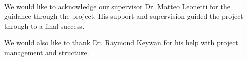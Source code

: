 \noindent\

We would like to acknowledge our supervisor Dr. Matteo Leonetti for the guidance through the project. His support and supervision guided the project through to a final success.

We would also like to thank Dr. Raymond Keywan for his help with project management and structure.